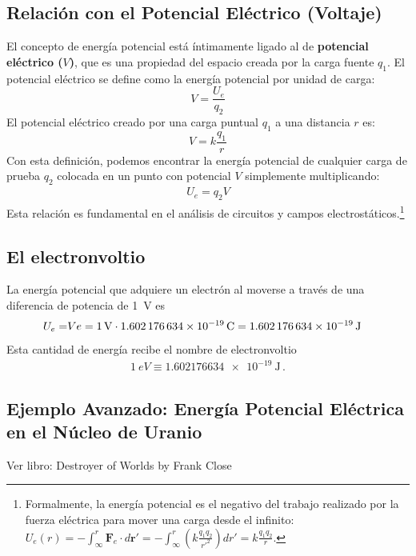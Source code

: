 \documentclass[11pt,a4paper]{book}
\begin{document}
\subsection*{Relación con el Potencial Eléctrico (Voltaje)}
El concepto de energía potencial está íntimamente ligado al de \textbf{potencial eléctrico ($V$)}, que es una propiedad del espacio creada por la carga fuente $q_1$. El potencial eléctrico se define como la energía potencial por unidad de carga:
\[ V = \frac{U_e}{q_2} \]
El potencial eléctrico creado por una carga puntual $q_1$ a una distancia $r$ es:
\[ V = k \frac{q_1}{r} \]
Con esta definición, podemos encontrar la energía potencial de cualquier carga de prueba $q_2$ colocada en un punto con potencial $V$ simplemente multiplicando:
\begin{align}
\label{eq:qV}
U_e = q_2 V
\end{align}
Esta relación es fundamental en el análisis de circuitos y campos electrostáticos.\footnote{Formalmente, la energía potencial es el negativo del trabajo realizado por la fuerza eléctrica para mover una carga desde el infinito: $U_e(r) = -\int_\infty^r \boldsymbol{F}_e \cdot d\boldsymbol{r}' = -\int_\infty^r (k \frac{q_1 q_2}{r'^2}) dr' = k \frac{q_1 q_2}{r}$.}

\subsection{El electronvoltio}
La energía potencial que adquiere un electrón al moverse a través de una diferencia de potencia de \qty{1}{V} es
\begin{align*}
    U_e = & V e = \qty{1}{V}\cdot \qty{1.602176634e-19}{\C} 
     =\qty{1.602176634e-19}{\joule}
\end{align*}
Esta cantidad de energía recibe el nombre de electronvoltio
\begin{align}
    \qty{1}{eV}\equiv\qty{1.602176634e-19}{\joule}\,.
\end{align}



\subsection{Ejemplo Avanzado: Energía Potencial Eléctrica en el Núcleo de Uranio}

Ver libro: Destroyer of Worlds by Frank Close \url{}
\end{document}
